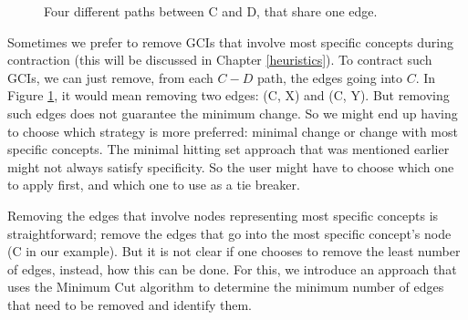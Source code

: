 \begin{figure}
\centering
{}
\caption{Four different paths between C and D, that share one edge.}
\label{ex1}
\end{figure}

Sometimes we prefer to remove GCIs that involve most specific concepts during contraction (this will be discussed in Chapter \ref{heuristics}). To contract such GCIs, we can just remove, from each $C-D$ path, the edges going into $C$. In Figure \ref{ex1}, it would mean removing two edges: (C, X) and (C, Y). But removing such edges does not guarantee the minimum change. So we might end up having to choose which strategy is more preferred: minimal change or change with most specific concepts. The minimal hitting set approach that was mentioned earlier might not always satisfy specificity. So the user might have to choose which one to apply first, and which one to use as a tie breaker.

Removing the edges that involve nodes representing most specific concepts is straightforward; remove the edges that go into the most specific concept's node (C in our example). But it is not clear if one chooses to remove the least number of edges, instead, how this can be done. For this, we introduce an approach that uses the Minimum Cut algorithm to determine the minimum number of edges that need to be removed and identify them.

